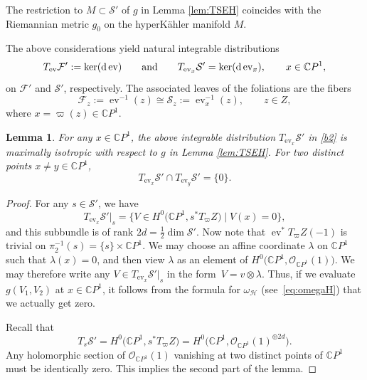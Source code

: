 \documentclass[pdftex]{sigma}
\numberwithin{equation}{section}
\newtheorem{Lemma}[Theorem]{Lemma}
\theoremstyle{definition}
\newcommand\C{{\mathbb C}}
\begin{document}
The restriction to $M \subset \mathcal S'$ of $g$ in Lemma \ref{lem:TSEH} coincides
with the Riemannian metric $g_0$ on the hyperK\"ahler manifold $M$.

The above considerations yield natural integrable distributions
\begin{equation}\label{b2}
T_{\operatorname{ev}}\mathcal F' := \ker({\rm d}\operatorname{ev})\qquad
\text{and}\qquad T_{\operatorname{ev}_x} \mathcal{S}' = \ker({\rm d}\operatorname{ev}_x),\qquad x \in \C P^1,
\end{equation}
on $\mathcal{F}'$ and $\mathcal{S}'$, respectively. The associated leaves of the foliations are the fibers
\[
\mathcal F_z := \operatorname{ev}^{-1}(z) \cong \mathcal{S}_z := \operatorname{ev}_x^{-1}(z), \qquad z \in Z,
\]
where $x = \varpi(z) \in \C P^1$.

\begin{Lemma}\label{lem:sl2web}
For any $x \in \C P^1$, the above integrable distribution $T_{\operatorname{ev}_{x}}\mathcal S'$ in
\eqref{b2} is maximally isotropic
with respect to $g$ in Lemma {\rm\ref{lem:TSEH}}. For two distinct points $x \neq y \in \C P^1$,
\[T_{\operatorname{ev}_{x}}\mathcal S'\cap T_{\operatorname{ev}_{y}}\mathcal S' = \{0\} .\]
\end{Lemma}

\begin{proof}
For any $s \in {\mathcal S}'$, we have
\[T_{\operatorname{ev}_{x}}\mathcal S'|_{s} = \bigl\{V \in
H^0\bigl(\C P^1, s^*T_\varpi Z\bigr) \mid V(x) = 0\bigr\},\]
and this subbundle is of rank $2d = \frac{1}{2}\dim \mathcal S'$. Now note that $\operatorname{ev}^*T_\varpi Z(-1)$ is trivial
on $\pi_2^{-1}(s) = \{s\}\times \C P^1$. We may choose an affine coordinate $\lambda$ on $\C P^1$ such that $\lambda(x) =
0$, and then view $\lambda$ as an element of $H^0\bigl(\C P^1, \mathcal{O}_{\C P^1}(1)\bigr)$. We may therefore write any $V \in
T_{\operatorname{ev}_{x}}\mathcal S'|_{s}$ in the form~${V = v\otimes \lambda}$. Thus, if we evaluate
$g(V_1, V_2)$ at $x \in \C P^1$, it follows from the formula for $\omega_\mathcal H$ (see~\eqref{eq:omegaH}) that we
actually get zero.

Recall that \[T_s{\mathcal S}' = H^0\bigl(\C P^1, s^*T_\varpi Z\bigr) = H^0\bigl(\C P^1, \mathcal{O}_{\C P^1}(1)^{\oplus 2d}\bigr).\]
Any holomorphic section of $\mathcal{O}_{\C P^1}(1)$ vanishing at two distinct points of $\C P^1$ must be identically
zero. This implies the second part of the lemma.
\end{proof}
\end{document}
